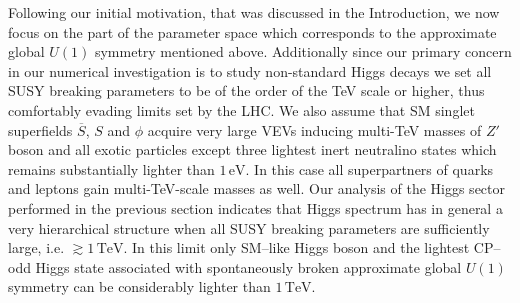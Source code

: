 \documentclass[12pt,a4paper]{article}
\begin{document}
Following our initial motivation, that was discussed in the Introduction, we now focus on the part of the parameter
space which corresponds to the approximate global $U(1)$ symmetry mentioned above. Additionally since our primary concern in our numerical investigation is to study non-standard Higgs decays we set all SUSY breaking parameters to be of the order of the TeV scale or higher, thus comfortably evading limits set by the LHC.
We also assume that SM singlet superfields $\overline{S}$, $S$ and $\phi$ acquire very large VEVs
inducing multi-TeV masses of $Z'$ boson and all exotic particles except three lightest inert neutralino states which
remains substantially lighter than $1\,\mbox{eV}$. In this case all superpartners of quarks and leptons gain multi-TeV-scale masses as well. Our analysis of the Higgs sector performed in the previous section indicates that
Higgs spectrum has in general a very hierarchical structure when all SUSY breaking parameters are sufficiently
large, i.e. $\gtrsim 1\,\mbox{TeV}$. In this limit only SM--like Higgs boson and the lightest CP--odd Higgs state
associated with spontaneously broken approximate global $U(1)$ symmetry can be considerably lighter than
$1\,\mbox{TeV}$.
\end{document}
